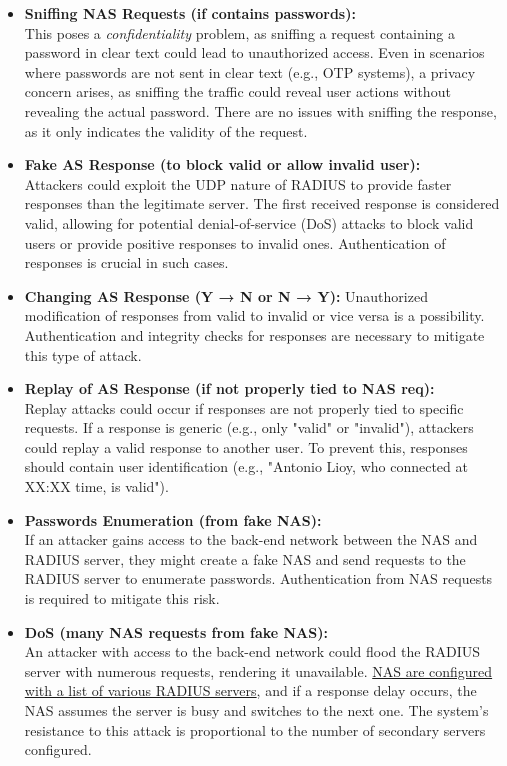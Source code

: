 \begin{itemize}
	\item \textbf{Sniffing NAS Requests (if contains passwords):}\\
	      This poses a \textit{confidentiality} problem, as sniffing a request containing a password in clear text could lead to unauthorized access. Even in scenarios where passwords are not sent in clear text (e.g., OTP systems), a privacy concern arises, as sniffing the traffic could reveal user actions without revealing the actual password. There are no issues with sniffing the response, as it only indicates the validity of the request.

	\item \textbf{Fake AS Response (to block valid or allow invalid user):}\\
	      Attackers could exploit the UDP nature of RADIUS to provide faster responses than the legitimate server. The first received response is considered valid, allowing for potential denial-of-service (DoS) attacks to block valid users or provide positive responses to invalid ones. Authentication of responses is crucial in such cases.

	\item \textbf{Changing AS Response (Y → N or N → Y):} Unauthorized modification of responses from valid to invalid or vice versa is a possibility. Authentication and integrity checks for responses are necessary to mitigate this type of attack.

	\item \textbf{Replay of AS Response (if not properly tied to NAS req):}\\
	      Replay attacks could occur if responses are not properly tied to specific requests. If a response is generic (e.g., only "valid" or "invalid"), attackers could replay a valid response to another user. To prevent this, responses should contain user identification (e.g., "Antonio Lioy, who connected at XX:XX time, is valid").

	\item \textbf{Passwords Enumeration (from fake NAS):}\\
	      If an attacker gains access to the back-end network between the NAS and RADIUS server, they might create a fake NAS and send requests to the RADIUS server to enumerate passwords. Authentication from NAS requests is required to mitigate this risk.

	\item \textbf{DoS (many NAS requests from fake NAS):} \\
	      An attacker with access to the back-end network could flood the RADIUS server with numerous requests, rendering it unavailable. \ul{NAS are configured with a list of various RADIUS servers}, and if a response delay occurs, the NAS assumes the server is busy and switches to the next one. The system's resistance to this attack is proportional to the number of secondary servers configured.
\end{itemize}


